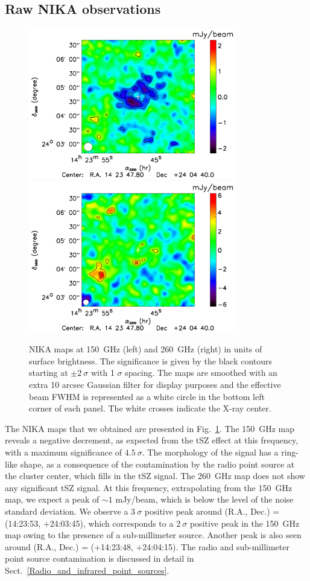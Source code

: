 \documentclass[traditabstract]{aa}
\begin{document}
\subsection{Raw NIKA observations}\label{sec:Raw_NIKA_observations}
\begin{figure}[h]
\centering
\includegraphics[height=6.6cm]{Figure/MACSJ1424_2mm_map.pdf}
\includegraphics[height=6.6cm]{Figure/MACSJ1424_1mm_map.pdf}
\caption{{\footnotesize NIKA maps at 150~GHz (left) and 260~GHz (right) in units of surface brightness. The significance is given by the black contours starting at $\pm 2 \ \sigma$ with 1 $\sigma$ spacing. The maps are smoothed with an extra 10 arcsec Gaussian filter for display purposes and the effective beam FWHM is represented as a white circle in the bottom left corner of each panel. The white crosses indicate the X-ray center.}}
\label{fig:flux_map}
\end{figure}
The NIKA maps that we obtained are presented in Fig.~\ref{fig:flux_map}. The 150~GHz map reveals a negative decrement, as expected from the tSZ effect at this frequency, with a maximum significance of $4.5 \ \sigma$. The morphology of the signal has a ring-like shape, as a consequence of the contamination by the radio point source at the cluster center, which fills in the tSZ signal. The 260~GHz map does not show any significant tSZ signal. At this frequency, extrapolating from the 150~GHz map, we expect a peak of $\sim 1$ mJy/beam, which is below the level of the noise standard deviation. We observe a $3 \ \sigma$ positive peak around (R.A., Dec.) = (14:23:53, +24:03:45), which corresponds to a $2 \ \sigma$ positive peak in the 150~GHz map owing to the presence of a sub-millimeter source. Another peak is also seen around (R.A., Dec.) = (+14:23:48, +24:04:15). The radio and sub-millimeter point source contamination is discussed in detail in Sect.~\ref{Radio_and_infrared_point_sources}.
\end{document}
